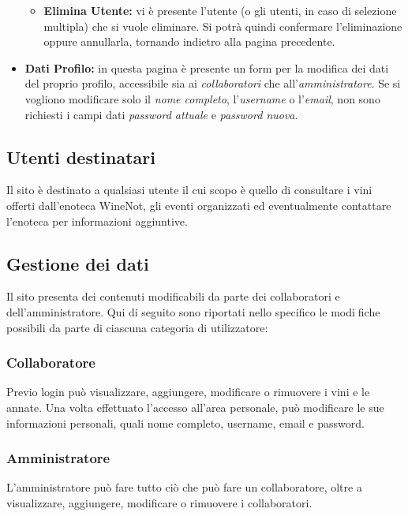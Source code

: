 \begin{itemize}
\begin{itemize}
			\item \textbf{Elimina Utente:} vi è presente l'utente (o gli utenti, in caso di selezione multipla) che si vuole eliminare. Si potrà quindi confermare l'eliminazione oppure annullarla, tornando indietro alla pagina precedente.
		\end{itemize}
	\item \textbf{Dati Profilo:} in questa pagina è presente un form per la modifica dei dati del proprio profilo, accessibile sia ai \textit{collaboratori} che all'\textit{amministratore}. Se si vogliono modificare solo il \textit{nome completo}, l'\textit{username} o l'\textit{email}, non sono richiesti i campi dati \textit{password attuale} e \textit{password nuova}.
\end{itemize}

\subsection{Utenti destinatari}

Il sito è destinato a qualsiasi utente il cui scopo è quello di consultare
i vini offerti dall'enoteca WineNot, gli eventi organizzati ed eventualmente contattare l'enoteca per informazioni aggiuntive. 

\subsection{Gestione dei dati}

Il sito presenta dei contenuti modificabili da parte dei collaboratori e dell'amministratore. 
Qui di seguito sono riportati nello specifico le modifiche possibili da parte di ciascuna categoria di utilizzatore:

\subsubsection{Collaboratore}

Previo login può visualizzare, aggiungere, modificare o rimuovere i vini e le annate. 
Una volta effettuato l'accesso all'area personale, può modificare le sue
informazioni personali, quali nome completo, username, email e password.

\subsubsection{Amministratore}

L'amministratore può fare tutto ciò che può fare un collaboratore, oltre a 
visualizzare, aggiungere, modificare o rimuovere i collaboratori.


